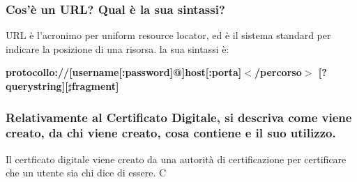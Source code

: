 \documentclass{article}
\begin{document}
\subsubsection{Cos'è un URL? Qual è la sua sintassi?}

URL è l'acronimo per uniform resource locator, ed è il sistema standard per indicare la posizione di una risorsa.
la sua sintassi è:
    
    \textbf{protocollo://[username[:password]@]host[:porta]$<$/percorso$>$  [?querystring][$\sharp$fragment]}

\subsubsection*{Relativamente al Certificato Digitale, si descriva come viene creato, da chi viene creato, cosa contiene e il suo utilizzo. }

Il certficato digitale viene creato da una autorità di certificazione per certificare che un utente sia chi dice di essere.
C
\end{document}
